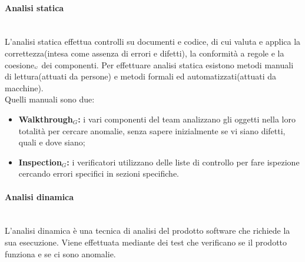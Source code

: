 \paragraph{Analisi statica}\label{ProcessiDiSupportoVerificaAttivitàAnalisiAnalisiStatica}\mbox{}\\
L'analisi statica effettua controlli su documenti e codice, di cui valuta e applica la correttezza(intesa come assenza di errori e difetti), la conformità a regole e la coesione$_{\scaleto{G}{3pt}}$ dei componenti.
Per effettuare analisi statica esistono metodi manuali di lettura(attuati da persone) e metodi formali ed automatizzati(attuati da macchine).\\
Quelli manuali sono due:
\begin{itemize}
	\item \textbf{Walkthrough$_G$:} i vari componenti del team analizzano gli oggetti nella loro totalità per
	cercare anomalie, senza sapere inizialmente se vi siano difetti, quali e dove siano;
	\item \textbf{Inspection$_G$:} i verificatori utilizzano delle liste di controllo per fare ispezione cercando errori specifici
	in sezioni specifiche.
\end{itemize}
\paragraph{Analisi dinamica}\label{ProcessiDiSupportoVerificaAttivitàAnalisiAnalisiDinamica}\mbox{}\\
L'analisi dinamica è una tecnica di analisi del prodotto software che richiede la sua esecuzione.
Viene effettuata mediante dei test che verificano se il prodotto funziona e se ci sono anomalie.\\

